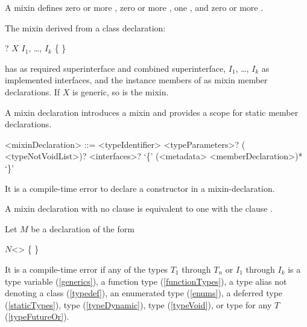 \documentclass[makeidx]{article}
\begin{document}
\LMHash{}%
A mixin defines zero or more
,
zero or more
,
one
,
and zero or more
.

\LMHash{}%
The mixin derived from a class declaration:

\begin{normativeDartCode}
\ABSTRACT? \CLASS{} $X$ \IMPLEMENTS{} $I_1$, \ldots, $I_k$ \{
\}
\end{normativeDartCode}

\noindent
has  as required superinterface
and combined superinterface,
$I_1$, \ldots, $I_k$ as implemented interfaces,
and the instance members of  as mixin member declarations.
If $X$ is generic, so is the mixin.

\LMHash{}%
A mixin declaration introduces a mixin and provides a scope
for static member declarations.

\begin{grammar}
<mixinDeclaration> ::= \MIXIN{} <typeIdentifier> <typeParameters>?
  \gnewline{} (\ON{} <typeNotVoidList>)? <interfaces>?
  \gnewline{} `\{' (<metadata> <memberDeclaration>)* `\}'
\end{grammar}

\LMHash{}%
It is a compile-time error to declare a constructor in a mixin-declaration.

\LMHash{}%
A mixin declaration with no \code{\ON} clause is equivalent
to one with the clause .

\LMHash{}%
Let $M$ be a \MIXIN{} declaration of the form

\begin{normativeDartCode}
\MIXIN{} $N$<\TypeParametersStd> \ON{} 
    \IMPLEMENTS{}  \{
\}
\end{normativeDartCode}

\LMHash{}%
It is a compile-time error if any of the types $T_1$ through $T_n$
or $I_1$ through $I_k$ is
a type variable (\ref{generics}),
a function type (\ref{functionTypes}),
a type alias not denoting a class (\ref{typedef}),
an enumerated type (\ref{enums}),
a deferred type (\ref{staticTypes}),
type \DYNAMIC{} (\ref{typeDynamic}),
type \VOID{} (\ref{typeVoid}),
or type  for any $T$ (\ref{typeFutureOr}).
\end{document}
